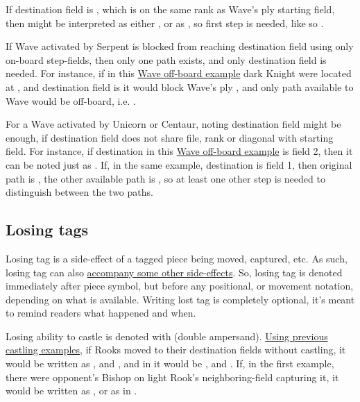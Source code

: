 If destination field is , which is on the same rank as Wave's ply starting field,
then  might be interpreted as either , or as \newline
{}, so first step is needed, like so .

If Wave activated by Serpent is blocked from reaching destination field using only on-board
step-fields, then only one path exists, and only destination field is needed. For instance,
if in this
\hyperref[fig:scn_tr_19_wave_out_of_board]{Wave off-board example} dark Knight were located at
, and destination field is  it would block Wave's ply ,
and only path available to Wave would be off-board, i.e. .

For a Wave activated by Unicorn or Centaur, noting destination field might be enough, if
destination field does not share file, rank or diagonal with starting field. For instance, if
destination in this \hyperref[fig:scn_mv_25_wave_off_board]{Wave off-board example} is field 2,
then it can be noted just as . If, in the same example, destination is field 1,
then original path is , the other available path is
, so at least one other step is needed to distinguish between the
two paths.

\subsection*{Losing tags}
\label{sec:Appendix/Notation/Losing tags}

Losing tag is a side-effect of a tagged piece being moved, captured, etc. As such, losing tag can
also \hyperref[tbl:Appendix/Summary/Accompanying-losing-tags]{accompany some other side-effects}.
So, losing tag is denoted immediately after piece symbol, but before any positional, or movement
notation, depending on what is available. Writing lost tag is completely optional, it's meant to
remind readers what happened and when.

Losing ability to castle is denoted with \alg{\&\&} (double ampersand).
\hyperref[sec:Appendix/Notation/Castling]{Using previous castling examples}, if Rooks
moved to their destination fields without castling, it would be written as ,
and , and in  it would be , and .
If, in the first example, there were opponent's Bishop on light Rook's neighboring-field
capturing it, it would be written as , or as  in
.

